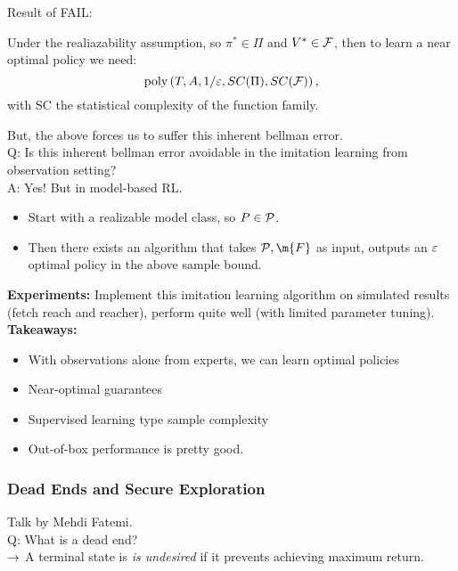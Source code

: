 Result of FAIL:
\begin{theorem}
Under the realiazability assumption, so $\pi^* \in \Pi$ and $V^* \in \mathcal{F}$, then to learn a near optimal policy we need:
\[
\text{poly}\left(T, A, 1/\varepsilon, SC(\Pi), SC(\mathcal{F})\right),
\]
with SC the statistical complexity of the function family.
\end{theorem}

But, the above forces us to suffer this inherent bellman error. \\

Q: Is this inherent bellman error avoidable in the imitation learning from observation setting? \\

A: Yes! But in model-based RL.
\begin{itemize}
    \item Start with a realizable model class, so $P \in \mathcal{P}$.
    \item Then there exists an algorithm that takes $\mc{P}, \m{F}$ as input, outputs an $\varepsilon$ optimal policy in the above sample bound.
\end{itemize}

{\bf Experiments:} Implement this imitation learning algorithm on simulated results (fetch reach and reacher), perform quite well (with limited parameter tuning). \\

{\bf Takeaways:}
\begin{itemize}
    \item With observations alone from experts, we can learn optimal policies
    \item Near-optimal guarantees
    \item Supervised learning type sample complexity
    \item Out-of-box performance is pretty good.
\end{itemize}

\spacerule

\subsubsection{Dead Ends and Secure Exploration}

Talk by Mehdi Fatemi. \\

Q: What is a dead end? \\

$\rightarrow$ A terminal state is {\it is undesired} if it prevents achieving maximum return. \\

